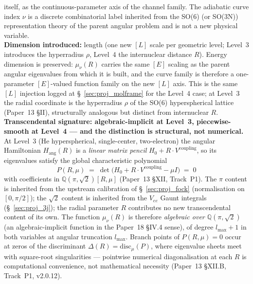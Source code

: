 itself, as the continuous-parameter axis of the channel family.  The
adiabatic curve index $\nu$ is a discrete combinatorial label inherited
from the SO(6) (or SO(3N)) representation theory of the parent angular
problem and is not a new physical variable.\\
\textbf{Dimension introduced:} length (one new $[L]$ scale per
geometric level; Level~3 introduces the hyperradius $\rho$, Level~4
the internuclear distance $R$).  Energy dimension is preserved:
$\mu_\nu(R)$ carries the same $[E]$ scaling as the parent angular
eigenvalues from which it is built, and the curve family is therefore
a one-parameter $[E]$-valued function family on the new $[L]$ axis.
This is the same $[L]$ injection logged at \S~\ref{sec:proj_molframe}
for the Level~4 case; at Level~3 the radial coordinate is the
hyperradius $\rho$ of the SO(6) hyperspherical lattice (Paper~13
§II), structurally analogous but distinct from internuclear $R$.\\
\textbf{Transcendental signature: algebraic-implicit at Level~3,
piecewise-smooth at Level~4 --- and the distinction is structural,
not numerical.}  At Level~3 (He hyperspherical, single-center,
two-electron) the angular Hamiltonian $H_\text{ang}(R)$ is a
\emph{linear matrix pencil} $H_0 + R \cdot V^\text{coupling}$, so its
eigenvalues satisfy the global characteristic polynomial
\[
  P(R, \mu) \;=\; \det\!\bigl(H_0 + R \cdot V^\text{coupling} - \mu I\bigr)
  \;=\; 0
\]
with coefficients in $\mathbb{Q}(\pi, \sqrt{2})[R, \mu]$ (Paper~13
§XII, Track~P1).  The $\pi$ content is inherited from the upstream
calibration of \S~\ref{sec:proj_fock} (normalisation on $[0, \pi/2]$);
the $\sqrt{2}$ content is inherited from the $V_{ee}$ Gaunt integrals
(\S~\ref{sec:proj_3j}); the radial parameter $R$ contributes no new
transcendental content of its own.  The function $\mu_\nu(R)$ is
therefore \emph{algebraic over $\mathbb{Q}(\pi, \sqrt{2})$} (an
algebraic-implicit function in the Paper~18 §IV.4 sense), of degree
$l_\text{max} + 1$ in both variables at angular truncation
$l_\text{max}$.  Branch points of $P(R, \mu) = 0$ occur at zeros of
the discriminant $\Delta(R) = \mathrm{disc}_\mu(P)$, where eigenvalue
sheets meet with square-root singularities — pointwise numerical
diagonalisation at each $R$ is computational convenience, not
mathematical necessity (Paper~13 §XII.B, Track~P1, v2.0.12).
\smallskip

